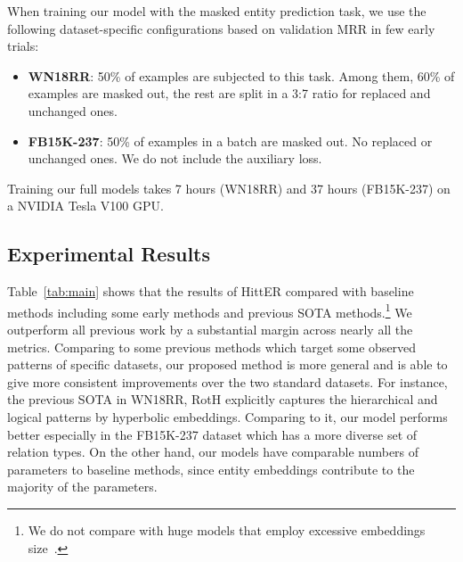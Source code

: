 \documentclass[11pt]{article}
\newcommand{\hit}{HittER\xspace}
\begin{document}
When training our model with the masked entity prediction task, we use the following dataset-specific configurations based on validation MRR in few early trials:
\begin{itemize}
    \item \textbf{WN18RR}: 50\% of examples are subjected to this task. Among them, 60\% of examples are masked out, the rest are split in a 3:7 ratio for replaced and unchanged ones.
    \item \textbf{FB15K-237}: 50\% of examples in a batch are masked out. No replaced or unchanged ones. We do not include the auxiliary loss.
\end{itemize}

Training our full models takes 7 hours (WN18RR) and 37 hours (FB15K-237) on a NVIDIA Tesla V100 GPU.

\subsection{Experimental Results}
\label{sec:results}

Table~\ref{tab:main} shows that the results of \hit{} compared with baseline methods including some early methods and previous SOTA methods.\footnote{We do not compare with huge models that employ excessive embeddings size~\cite{lacroix2018canonical}.} We outperform all previous work by a substantial margin across nearly all the metrics.
Comparing to some previous methods which target some observed patterns of specific datasets, our proposed method is more general and is able to give more consistent improvements over the two standard datasets.
For instance, the previous SOTA in WN18RR, RotH explicitly captures the hierarchical and logical patterns by hyperbolic embeddings.
Comparing to it, our model performs better especially in the FB15K-237 dataset which has a more diverse set of relation types.
On the other hand, our models have comparable numbers of parameters to baseline methods, since entity embeddings contribute to the majority of the parameters.
\end{document}
